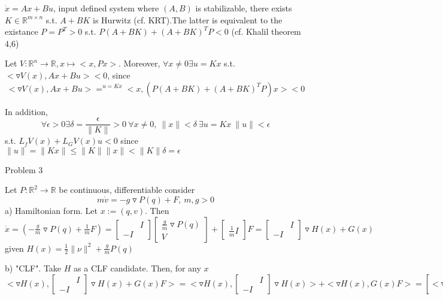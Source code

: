 $\dot{x} = Ax + Bu$, input defined system where $(A,B)$ is stabilizable, there exists $K \in \mathbb{R}^{m \times n}$ s.t. $A+BK$ is Hurwitz (cf. KRT).The latter is equivalent to the existance $P = P^T > 0$ s.t. $P(A+BK) + (A+BK)^TP < 0$ (cf. Khalil theorem 4,6)

Let $V: \mathbb{R}^n \to \mathbb{R}, x \mapsto <x, Px>$. Moreover, $\forall x \neq 0 \exists u = Kx$ s.t. $<\triangledown V(x), Ax+Bu> < 0$, since 
\begin{equation*}
<\triangledown V(x), Ax+Bu> =^{u = Kx} <x, (P(A+BK)+ (A+BK)^TP)x> < 0
\end{equation*} 

In addition,
\begin{equation*}
\forall \epsilon > 0 \exists \delta = \frac{\epsilon}{\|K\| } > 0 \ \forall x \neq 0, \ \|x\| < \delta \ \exists u = Kx \ \|u\| < \epsilon 
\end{equation*}
s.t. $L_fV(x) + L_GV(x)u < 0$ since $\|u\| = \|Kx\| \leq \|K\|\|x\| < \|K\|\delta = \epsilon$

Problem 3

Let $P: \mathbb{R}^2 \to \mathbb{R}$ be continuous, differentiable consider 
\begin{equation*}
m\dot{v}  = - g \triangledown P(q) + F, \ m,g >0
\end{equation*} 
a) Hamiltonian form. Let $x:=(q,v)$. Then $\dot{x} = (-\frac{g}{m}\triangledown P(q) + \frac{1}{m}F)= \begin{bmatrix}
 & I \\
 -I & 
\end{bmatrix}\begin{bmatrix}
 \frac{g}{m}\triangledown P(q) \\
 V 
\end{bmatrix} + \begin{bmatrix}
  \\
 \frac{1}{m}I
\end{bmatrix}F = \begin{bmatrix}
 & I \\
 -I & 
\end{bmatrix} \triangledown H(x) + G(x)$ given $H(x) = \frac{1}{2}\|\nu\|^2 + \frac{g}{m}P(q)$

b) "CLF". Take $H$ as a CLF candidate. Then, for any $x$ 
\begin{equation*}
<\triangledown H(x), \begin{bmatrix}
 & I \\
 -I & 
\end{bmatrix} \triangledown H(x) + G(x)F> = <\triangledown H(x), \begin{bmatrix}
 & I \\
 -I & 
\end{bmatrix} \triangledown H(x)> + <\triangledown H(x), G(x)F> = [<\triangledown H(x), \begin{bmatrix}
 & I \\
 -I & 
\end{bmatrix} \triangledown H(x)> = L_fH(x) = 0] = \frac{1}{m} <\nu, F>
\end{equation*}

